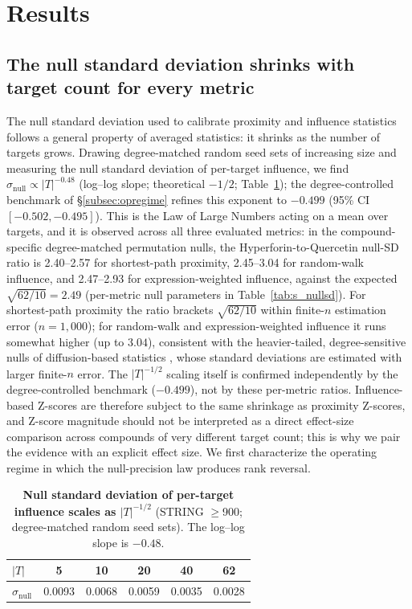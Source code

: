 \section{Results}

\subsection{The null standard deviation shrinks with target count for every metric}

The null standard deviation used to calibrate proximity and influence statistics follows a general property of averaged statistics: it shrinks as the number of targets grows. Drawing degree-matched random seed sets of increasing size and measuring the null standard deviation of per-target influence, we find $\sigma_{\text{null}} \propto |T|^{-0.48}$ (log--log slope; theoretical $-1/2$; Table~\ref{tab:scaling}); the degree-controlled benchmark of \S\ref{subsec:opregime} refines this exponent to $-0.499$ (95\% CI $[-0.502,-0.495]$). This is the Law of Large Numbers acting on a mean over targets, and it is observed across all three evaluated metrics: in the compound-specific degree-matched permutation nulls, the Hyperforin-to-Quercetin null-SD ratio is 2.40--2.57 for shortest-path proximity, 2.45--3.04 for random-walk influence, and 2.47--2.93 for expression-weighted influence, against the expected $\sqrt{62/10} = 2.49$ (per-metric null parameters in Table~\ref{tab:s_nullsd}). For shortest-path proximity the ratio brackets $\sqrt{62/10}$ within finite-$n$ estimation error ($n=1{,}000$); for random-walk and expression-weighted influence it runs somewhat higher (up to $3.04$), consistent with the heavier-tailed, degree-sensitive nulls of diffusion-based statistics \citep{Cowen2017, Erten2011}, whose standard deviations are estimated with larger finite-$n$ error. The $|T|^{-1/2}$ scaling itself is confirmed independently by the degree-controlled benchmark ($-0.499$), not by these per-metric ratios. Influence-based Z-scores are therefore subject to the same shrinkage as proximity Z-scores, and Z-score magnitude should not be interpreted as a direct effect-size comparison across compounds of very different target count; this is why we pair the evidence with an explicit effect size. We first characterize the operating regime in which the null-precision law produces rank reversal.

\begin{table}[ht]
\centering
\caption{\textbf{Null standard deviation of per-target influence scales as $|T|^{-1/2}$} (STRING $\geq$900; degree-matched random seed sets). The log--log slope is $-0.48$.}
\label{tab:scaling}
\begin{tabular}{@{}lccccc@{}}
\toprule
$|T|$ & 5 & 10 & 20 & 40 & 62 \\
\midrule
$\sigma_{\text{null}}$ & 0.0093 & 0.0068 & 0.0059 & 0.0035 & 0.0028 \\
\bottomrule
\end{tabular}
\end{table}



